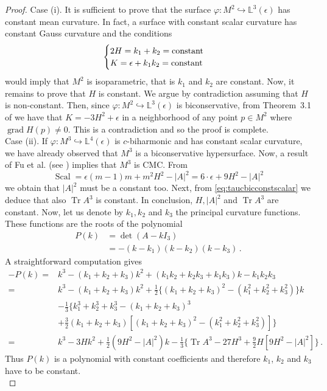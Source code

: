 \documentclass[11pt,leqno]{amsart}
\theoremstyle{plain}
\theoremstyle{definition}
\numberwithin{equation}{section}
\newcommand{\Scal}{\operatorname{Scal}}
\DeclareMathOperator{\grad}{grad}
\DeclareMathOperator{\trace}{Tr}
\numberwithin{equation}{section}
\begin{document}
{\begin{proof}
Case (i). It is sufficient to prove that the surface $\varphi: M^2 \hookrightarrow \mathbb{L}^3(\epsilon)$ has constant mean curvature. In fact, a surface with constant scalar curvature has constant Gauss curvature and the conditions
\[
\begin{cases}
2 H=k_1+k_2={\rm constant}\\
K=\epsilon+k_1 k_2={\rm constant}
\end{cases}
\]
would imply that $M^2$ is isoparametric, that is $k_1$ and $k_2$ are constant. 
Now, it remains to prove that $H$ is constant. We argue by contradiction assuming that $H$ is non-constant. Then, since $\varphi: M^2 \hookrightarrow \mathbb{L}^3(\epsilon)$ is biconservative, from Theorem~3.1 of \cite{MR3180932} we have that $K=-3 H^2+\epsilon$ in a neighborhood of any point $p\in M^2$ where $\grad H(p)\neq 0$. This is a contradiction and so the proof is complete. \\

Case (ii). If  $\varphi: M^3 \hookrightarrow \mathbb{L}^4(\epsilon)$ is $c$-biharmonic and has constant scalar curvature, we have already observed that  $M^3$ is a biconservative hypersurface. Now, a result of Fu et al. (see \cite[Theorem~1.1]{MR4903596}) implies that $M^3$ is CMC. 
From
$$
\Scal=\epsilon(m-1) m+m^2 H^2-|A|^2=6 \cdot \epsilon+9 H^2-|A|^2
$$
we obtain that $|A|^2$ must be a constant too.
Next, from \eqref{eq:taucbicconstscalar} we deduce that
also $\trace A^3$ is constant.
In conclusion, $H, |A|^2$ and $\trace A^3$ are constant.
Now, let us denote by $k_1, k_2$ and $k_3$ the principal curvature functions. These functions are the roots of the polynomial 
$$
\begin{aligned}
P(k) & =\operatorname{det}\left(A-k I_3\right) \\
& =-\left(k-k_1\right)\left(k-k_2\right)\left(k-k_3\right)\,.
\end{aligned}
$$
A straightforward computation gives
$$
\begin{aligned}
-P(k)= & k^3-\left(k_1+k_2+k_3\right)   k^2+\left(k_1 k_2+k_2 k_3+k_1 k_3\right) k- 
 k_1   k_2   k_3 \\
= & k^3-\left(k_1+k_2+k_3\right)   k^2+\frac{1}{2}\Big\{\left(k_1+k_2+k_3\right)^2-\left(k_1^2+k_2^2+k_3^2\right)\Big\}   k \\
& -\frac{1}{3}  \Big\{k_1^3+k_2^3+k_3^3-\left(k_1+k_2+k_3\right)^3 \\
&+\frac{3}{2}\left(k_1+k_2+k_3\right)\left[\left(k_1+k_2+k_3\right)^2-\left(k_1^2+k_2^2+k_3^2\right)\right]\Big\}\\
=& k^3-3 H  k^2+\frac{1}{2}\left(9  H^2-|A|^2\right) k
 -\frac{1}{3}\Big\{\trace A^3-27  H^3+\frac{9}{2} H \left[9 H^2-|A|^2\right]\Big\}\,.
\end{aligned}
$$
Thus $P(k)$ is a polynomial with constant coefficients and therefore $k_1$, $k_2$ and $k_3$ have to be constant.\\


\end{proof}}
\end{document}
